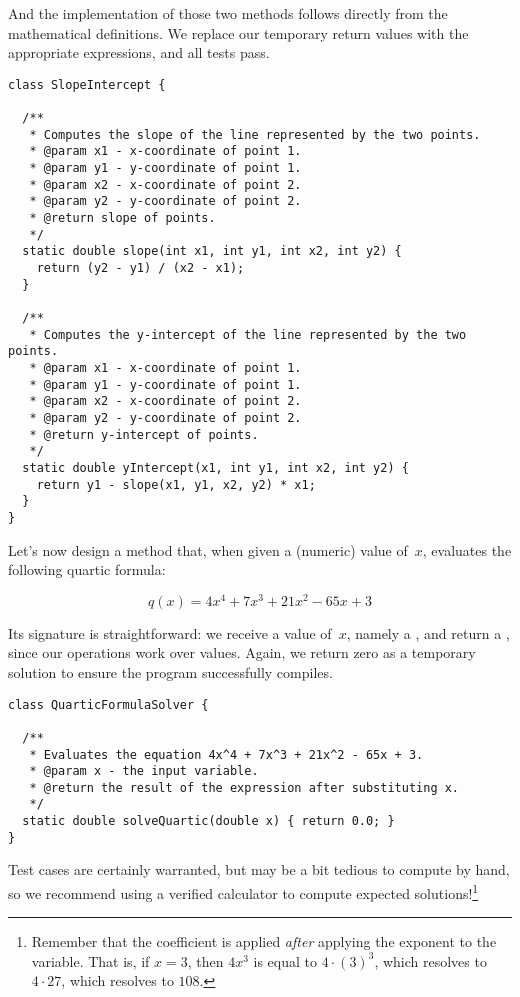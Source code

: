 And the implementation of those two methods follows directly from the mathematical definitions. 
We replace our temporary  return values with the appropriate expressions, and all tests pass.

\begin{lstlisting}[language=MyJava]
class SlopeIntercept {

  /**
   * Computes the slope of the line represented by the two points.
   * @param x1 - x-coordinate of point 1.
   * @param y1 - y-coordinate of point 1.
   * @param x2 - x-coordinate of point 2.
   * @param y2 - y-coordinate of point 2.
   * @return slope of points.
   */
  static double slope(int x1, int y1, int x2, int y2) {
    return (y2 - y1) / (x2 - x1);
  }

  /**
   * Computes the y-intercept of the line represented by the two points.
   * @param x1 - x-coordinate of point 1.
   * @param y1 - y-coordinate of point 1.
   * @param x2 - x-coordinate of point 2.
   * @param y2 - y-coordinate of point 2.
   * @return y-intercept of points.
   */
  static double yIntercept(x1, int y1, int x2, int y2) {
    return y1 - slope(x1, y1, x2, y2) * x1;
  }
}
\end{lstlisting}

Let's now design a method that, when given a (numeric) value of~$x$, evaluates the following quartic formula:

\[
q(x) = 4x^4 + 7x^3 + 21x^2 - 65x + 3
\]

Its signature is straightforward: we receive a value of~$x$, namely a , and return a , since our operations work over  values. 
Again, we return zero as a temporary solution to ensure the program successfully compiles.

\begin{lstlisting}[language=MyJava]
class QuarticFormulaSolver {

  /**
   * Evaluates the equation 4x^4 + 7x^3 + 21x^2 - 65x + 3.
   * @param x - the input variable.
   * @return the result of the expression after substituting x.
   */
  static double solveQuartic(double x) { return 0.0; }
}
\end{lstlisting}

Test cases are certainly warranted, but may be a bit tedious to compute by hand, so we recommend using a verified calculator to compute expected solutions!\footnote{Remember that the coefficient is applied \emph{after} applying the exponent to the variable. That is, if $x=3$, then $4x^3$ is equal to $4 \cdot (3)^3$, which resolves to $4 \cdot 27$, which resolves to $108$.}

